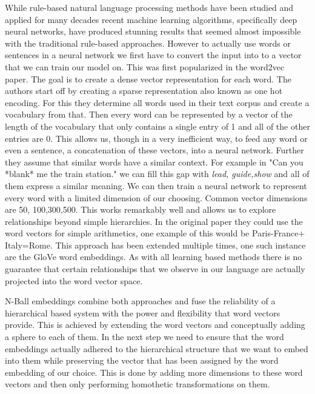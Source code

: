 \documentclass[]{article}
\begin{document}
While rule-based natural language processing methods have been studied and applied for many decades recent machine learning algorithms, specifically deep neural networks, have produced stunning results that seemed almost impossible with the traditional rule-based approaches. However to actually use words or sentences in a neural network we first have to convert the input into to a vector that we can train our model on. This was first popularized in the word2vec paper. The goal is to create a dense vector representation for each word. The authors start off by creating a sparse representation also known as one hot encoding. For this they determine all words used in their text corpus and create a vocabulary from that. Then every word can be represented by a vector of the length of the vocabulary that only contains a single entry of 1 and all of the other entries are 0. This allows us, though in a very inefficient way, to feed any word or even a sentence, a concatenation of these vectors, into a neural network. Further they assume that similar words have a similar context. For example in "Can you *blank* me the train station." we can fill this gap with \textit{lead, guide,show} and all of them express a similar meaning. We can then train a neural network to represent every word with a limited dimension of our choosing. Common vector dimensions are 50, 100,300,500. This works remarkably well and allows us to explore relationships beyond simple hierarchies. In the original paper they could use the word vectors for simple arithmetics, one example of this would be Paris-France+ Italy=Rome. This approach has been extended multiple times, one such instance are the GloVe word embeddings. As with all learning based methods there is no guarantee that certain relationships that we observe in our language are actually projected into the word vector space. 

N-Ball embeddings combine both approaches and fuse the reliability of a hierarchical based system with the power and flexibility that  word vectors provide. This is achieved by extending the word vectors and conceptually adding a sphere to each of them. In the next step we need to ensure that the word embeddings actually adhered to the hierarchical structure that we want to embed into them while preserving the vector that has been assigned by the word embedding of our choice. This is done by adding more dimensions to these word vectors and then only performing homothetic transformations on them.
\end{document}
